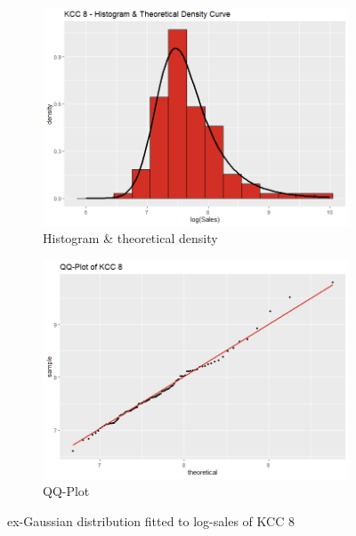  \begin{figure}[H]
\centering
\begin{subfigure}{.45\textwidth}
  \centering
  \includegraphics[width=\linewidth]{figures/kcc_8_density.png}
  \caption{Histogram \& theoretical density}
  \label{fig:kcc_8_density}
\end{subfigure}
\begin{subfigure}{.45\textwidth}
  \centering
  \includegraphics[width=\linewidth]{figures/kcc_8_qqplot.png}
  \caption{QQ-Plot}
  \label{fig:kcc_8_qqplot}
\end{subfigure}
\caption{ex-Gaussian distribution fitted to log-sales of \ac{KCC} 8}
\label{fig:kcc_8_marginal}
\end{figure} 


